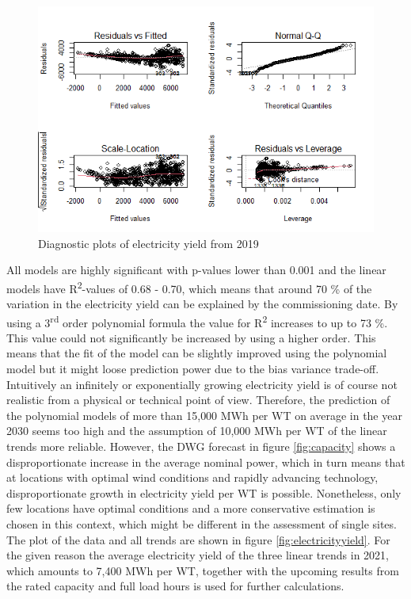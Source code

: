 \documentclass[a4paper,11pt]{article}
\begin{document}
\begin{figure}

{\centering \includegraphics[width=1\linewidth]{data/Amprion/results_of_analysis/diagnostic} 

}

\caption{Diagnostic plots of electricity yield from 2019}\label{fig:diagnostic}
\end{figure}
All models are highly significant with p-values lower than 0.001 and the linear models have R\textsuperscript{2}-values of 0.68 - 0.70, which means that around 70 \% of the variation in the electricity yield can be explained by the commissioning date. By using a 3\textsuperscript{rd} order polynomial formula the value for R\textsuperscript{2} increases to up to 73 \%. This value could not significantly be increased by using a higher order. This means that the fit of the model can be slightly improved using the polynomial model but it might loose prediction power due to the bias variance trade-off. Intuitively an infinitely or exponentially growing electricity yield is of course not realistic from a physical or technical point of view. Therefore, the prediction of the polynomial models of more than 15,000 MWh per WT on average in the year 2030 seems too high and the assumption of 10,000 MWh per WT of the linear trends more reliable. However, the DWG forecast in figure \ref{fig:capacity} shows a disproportionate increase in the average nominal power, which in turn means that at locations with optimal wind conditions and rapidly advancing technology, disproportionate growth in electricity yield per WT is possible. Nonetheless, only few locations have optimal conditions and a more conservative estimation is chosen in this context, which might be different in the assessment of single sites. The plot of the data and all trends are shown in figure \ref{fig:electricityyield}. For the given reason the average electricity yield of the three linear trends in 2021, which amounts to 7,400 MWh per WT, together with the upcoming results from the rated capacity and full load hours is used for further calculations.
\end{document}
